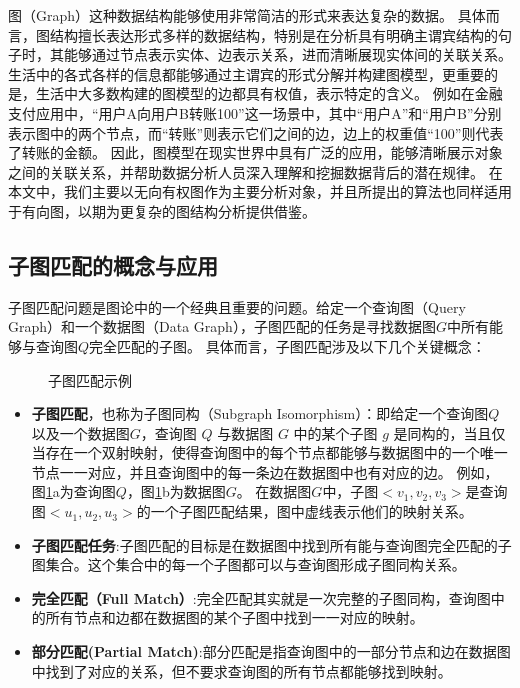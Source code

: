 图（Graph）这种数据结构能够使用非常简洁的形式来表达复杂的数据。
具体而言，图结构擅长表达形式多样的数据结构，特别是在分析具有明确主谓宾结构的句子时，其能够通过节点表示实体、边表示关系，进而清晰展现实体间的关联关系。
生活中的各式各样的信息都能够通过主谓宾的形式分解并构建图模型，更重要的是，生活中大多数构建的图模型的边都具有权值，表示特定的含义。
例如在金融支付应用中，“用户A向用户B转账100”这一场景中，其中“用户A”和“用户B”分别表示图中的两个节点，而“转账”则表示它们之间的边，边上的权重值“100”则代表了转账的金额。
因此，图模型在现实世界中具有广泛的应用，能够清晰展示对象之间的关联关系，并帮助数据分析人员深入理解和挖掘数据背后的潜在规律。
在本文中，我们主要以无向有权图作为主要分析对象，并且所提出的算法也同样适用于有向图，以期为更复杂的图结构分析提供借鉴。

\subsection{子图匹配的概念与应用}
子图匹配问题是图论中的一个经典且重要的问题。给定一个查询图（Query Graph）和一个数据图（Data Graph），子图匹配的任务是寻找数据图$G$中所有能够与查询图$Q$完全匹配的子图。
具体而言，子图匹配涉及以下几个关键概念：
\begin{figure}[h!]
    \centering
    \caption{子图匹配示例}
    \label{fig:example_subgraph_matching}
\end{figure}
\begin{itemize}
    \item \textbf{子图匹配}，也称为子图同构（Subgraph Isomorphism）：即给定一个查询图$Q$以及一个数据图$G$，查询图 $Q$ 与数据图 $G$ 中的某个子图 $g$ 是同构的，当且仅当存在一个双射映射，使得查询图中的每个节点都能够与数据图中的一个唯一节点一一对应，并且查询图中的每一条边在数据图中也有对应的边。
    例如，图\ref{fig:example_subgraph_matching}a为查询图$Q$，图\ref{fig:example_subgraph_matching}b为数据图$G$。
    在数据图$G$中，子图$<v_1,v_2,v_3>$是查询图$<u_1,u_2,u_3>$的一个子图匹配结果，图中虚线表示他们的映射关系。
    \item \textbf{子图匹配任务}:子图匹配的目标是在数据图中找到所有能与查询图完全匹配的子图集合。这个集合中的每一个子图都可以与查询图形成子图同构关系。
    \item \textbf{完全匹配（Full Match）}:完全匹配其实就是一次完整的子图同构，查询图中的所有节点和边都在数据图的某个子图中找到一一对应的映射。
    \item \textbf{部分匹配(Partial Match)}:部分匹配是指查询图中的一部分节点和边在数据图中找到了对应的关系，但不要求查询图的所有节点都能够找到映射。
\end{itemize}

